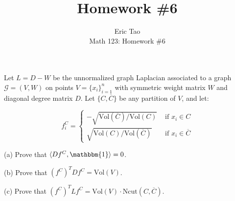 \documentclass[10pt]{article}
\newcommand{\vol}{{\text{Vol}}}
\newenvironment{problem}[2][]{\begin{trivlist}
\item[\hskip \labelsep {\bfseries #1}\hskip \labelsep {\bfseries #2.}]}{\end{trivlist}}
\begin{document}
 
\title{Homework \#6}
\author{Eric Tao\\
Math 123: Homework \#6}
\maketitle

\begin{problem}{Question 1}

Let $L = D - W$ be the unnormalized graph Laplacian associated to a graph $\mathcal{G} = (V,W)$ on points $V = \{ x_i \}_{i=1}^n$ with symmetric weight matrix $W$ and diagonal degree matrix $D$. Let $\{ C, \overline{C} \}$ be any partition of $V$, and let:

$$ f^C_i = \begin{cases} -\sqrt{\vol(\overline{C})/\vol(C)} & \text{ if } x_i \in C \\ \sqrt{\vol(C)/\vol(\overline{C})} & \text{ if } x_i \in \overline{C} \end{cases} $$

(a) Prove that $\langle Df^C, \mathbbm{1} \rangle = 0$.

(b) Prove that $(f^C)^T D f^C = \vol(V)$.

(c) Prove that $(f^C)^T L f^C = \vol(V) \cdot \text{Ncut}(C, \overline{C})$.

\end{problem}
\end{document}
